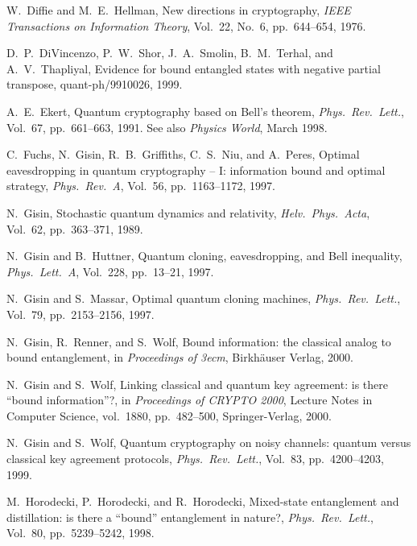 \documentclass{article}
\begin{document}
\begin{thebibliography}{10}
 W.~Diffie and M.~E.~Hellman, New directions in
  cryptography, {\em IEEE Transactions on Information Theory}, 
Vol.~22, No.~6, pp.~644--654, 1976.




D.~P.~DiVincenzo, P.~W.~Shor, J.~A.~Smolin, B.~M.~Terhal,
and A.~V.~Thapliyal, Evidence for bound entangled states with negative 
partial transpose, quant-ph/9910026, 1999.

A.\ E.\ Ekert, Quantum cryptography based on Bell's theorem,
{\em Phys.\ Rev.\ Lett.}, Vol.~67, pp.~661--663, 1991. See also  {\em Physics World},
March 1998.

 C.~Fuchs, N.~Gisin, R.~B.~Griffiths, C.~S.~Niu, and A.~Peres,
Optimal eavesdropping in quantum cryptography -- I: information bound and optimal
strategy, {\em 
           Phys.\ Rev.~A},  Vol.~56, pp.~1163--1172, 1997.


 N.~Gisin, Stochastic quantum dynamics and relativity, 
{\em Helv.\ Phys.\ Acta}, Vol.~62, pp.~363--371, 
1989.



 N.\ Gisin and B.\ Huttner, 
Quantum cloning, eavesdropping, and Bell inequality,
{\em Phys.\ Lett.~A}, Vol.~228,
pp.~13--21, 1997.

 N.~Gisin and S.~Massar, 
Optimal quantum cloning machines,
{\em Phys.\ Rev.\ Lett.}, Vol.~79, pp.~2153--2156, 1997.

N.\ Gisin, R.\ Renner, and S.\ Wolf,
Bound information: the classical analog to bound entanglement,
in {\em Proceedings of 3ecm}, Birkh\"auser Verlag, 2000.



N.\ Gisin and S.\ Wolf,
Linking classical and quantum key agreement: is there ``bound
information''?, in {\em Proceedings of CRYPTO 2000},  
Lecture Notes in Computer Science, vol.~1880, pp.~482--500,
Springer-Verlag, 2000.

 N.~Gisin and S.~Wolf, Quantum cryptography on 
noisy channels: quantum versus classical key agreement protocols,
{\em Phys.\ Rev.\ Lett.}, Vol.~83, pp.~4200--4203, 1999.





       M.~Horodecki, P.~Horodecki, and  R.~Horodecki, 
Mixed-state entanglement and distillation: is there a ``bound''
entanglement in nature?, {\em 
Phys.\ Rev.\ Lett.}, Vol.~80, pp.~5239--5242, 1998.




\end{thebibliography}
\end{document}
